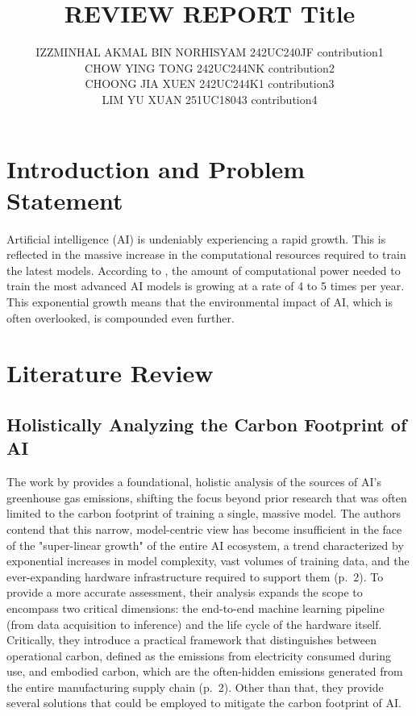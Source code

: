 \documentclass[a4paper, 12pt]{article}
\author{
IZZMINHAL AKMAL BIN NORHISYAM \quad 242UC240JF \quad contribution1 \\
CHOW YING TONG \quad 242UC244NK \quad contribution2\\
CHOONG JIA XUEN \quad 242UC244K1 \quad contribution3\\
LIM YU XUAN \quad 251UC18043 \quad contribution4\\
}
\title{ REVIEW REPORT  Title  }
\begin{document}
\maketitle


\section{Introduction and Problem Statement}
Artificial intelligence (AI) is undeniably experiencing a rapid growth. This is reflected in the massive increase in the computational resources required to train the latest models. According to \citet{Sevilla_Roldan_2024}, the amount of computational power needed to train the most advanced AI models is growing at a rate of 4 to 5 times per year. This exponential growth means that the environmental impact of AI, which is often overlooked, is compounded even further.

\section{Literature Review}
\subsection{Holistically Analyzing the Carbon Footprint of AI}
The work by \citet{Wu2022} provides a foundational, holistic analysis of the sources of AI's greenhouse gas emissions, shifting the focus beyond prior research that was often limited to the carbon footprint of training a single, massive model. The authors contend that this narrow, model-centric view has become insufficient in the face of the "super-linear growth" of the entire AI ecosystem, a trend characterized by exponential increases in model complexity, vast volumes of training data, and the ever-expanding hardware infrastructure required to support them (p.~2). To provide a more accurate assessment, their analysis expands the scope to encompass two critical dimensions: the end-to-end machine learning pipeline (from data acquisition to inference) and the life cycle of the hardware itself. Critically, they introduce a practical framework that distinguishes between operational carbon, defined as the emissions from electricity consumed during use, and embodied carbon, which are the often-hidden emissions generated from the entire manufacturing supply chain (p.~2). Other than that, they provide several solutions that could be employed to mitigate the carbon footprint of AI.
\end{document}
